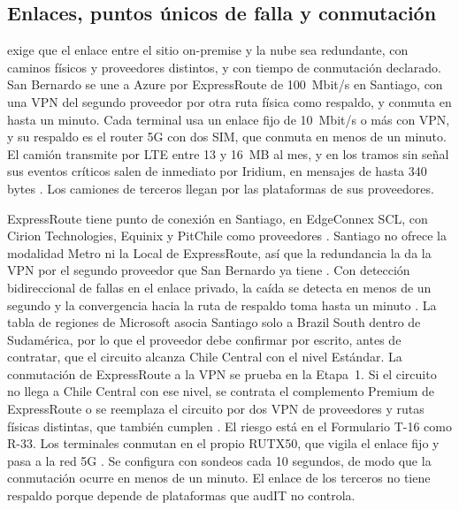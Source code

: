 \subsection{Enlaces, puntos únicos de falla y conmutación}\label{sec:4-enlaces}

 exige que el enlace entre el sitio on-premise y la nube sea redundante, con
caminos físicos y proveedores distintos, y con tiempo de conmutación declarado. San Bernardo se une a Azure por ExpressRoute de
100~Mbit/s en Santiago, con una VPN del segundo proveedor por otra ruta física como respaldo, y conmuta
en hasta un minuto. Cada terminal usa un enlace fijo de 10~Mbit/s o más con VPN, y su respaldo es el
router 5G con dos SIM, que conmuta en menos de un minuto. El camión transmite por LTE entre 13 y 16~MB
al mes, y en los tramos sin señal sus eventos críticos salen de inmediato por Iridium, en mensajes de
hasta 340 bytes \parencite{groundcontrol_edge}. Los camiones de terceros llegan por las plataformas de
sus proveedores.

ExpressRoute tiene punto de conexión en Santiago, en EdgeConnex SCL, con Cirion Technologies, Equinix y
PitChile como proveedores \parencite{ms_er_locations}. Santiago no ofrece la modalidad Metro ni la Local
de ExpressRoute, así que la redundancia la da la VPN por el segundo proveedor que San Bernardo ya tiene
. Con detección bidireccional de fallas en el enlace privado, la caída se detecta
en menos de un segundo y la convergencia hacia la ruta de respaldo toma hasta un minuto
\parencite{ms_er_bfd}. La tabla de regiones de Microsoft asocia Santiago solo a Brazil South dentro de
Sudamérica, por lo que el proveedor debe confirmar por escrito, antes de contratar, que el circuito
alcanza Chile Central con el nivel Estándar. La conmutación de ExpressRoute a la VPN se prueba en la
Etapa~1. Si el circuito no llega a Chile Central con ese nivel, se contrata el complemento Premium de
ExpressRoute o se reemplaza el circuito por dos VPN de proveedores y rutas físicas distintas, que también
cumplen . El riesgo está en el Formulario T-16 como R-33. Los terminales conmutan en el propio RUTX50, que vigila el enlace fijo y pasa a la red 5G
\parencite{teltonika_rutx50}. Se configura con sondeos cada 10 segundos, de modo que la conmutación
ocurre en menos de un minuto. El enlace de los terceros no tiene respaldo porque depende de plataformas
que audIT no controla.

